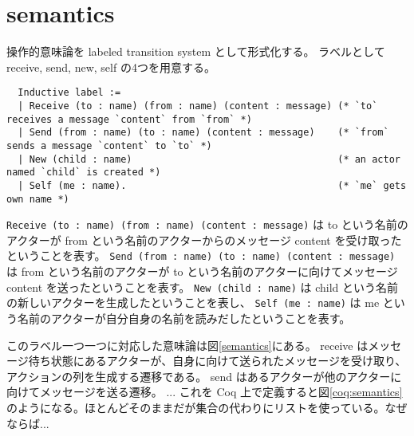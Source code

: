 \section{semantics}

操作的意味論を labeled transition system として形式化する。
ラベルとして receive, send, new, self の4つを用意する。

\begin{lstlisting}
  Inductive label :=
  | Receive (to : name) (from : name) (content : message) (* `to` receives a message `content` from `from` *)
  | Send (from : name) (to : name) (content : message)    (* `from` sends a message `content` to `to` *)
  | New (child : name)                                    (* an actor named `child` is created *)
  | Self (me : name).                                     (* `me` gets own name *)
\end{lstlisting}

\texttt{Receive (to : name) (from : name) (content : message)} は to という名前のアクターが from という名前のアクターからのメッセージ content を受け取ったということを表す。
\texttt{Send (from : name) (to : name) (content : message)} は from という名前のアクターが to という名前のアクターに向けてメッセージ content を送ったということを表す。
\texttt{New (child : name)} は child という名前の新しいアクターを生成したということを表し、
\texttt{Self (me : name)} は me という名前のアクターが自分自身の名前を読みだしたということを表す。

このラベル一つ一つに対応した意味論は図\ref{semantics}にある。
receive はメッセージ待ち状態にあるアクターが、自身に向けて送られたメッセージを受け取り、アクションの列を生成する遷移である。
send はあるアクターが他のアクターに向けてメッセージを送る遷移。
...
これを Coq 上で定義すると図\ref{coq:semantics}のようになる。ほとんどそのままだが集合の代わりにリストを使っている。なぜならば...

\begin{figure}[h]
\end{figure}




